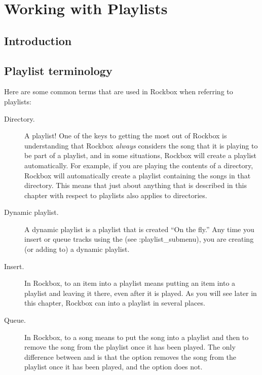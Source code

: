 \chapter{Working with Playlists}
\label{ref:working_with_playlists}

\section{Introduction}

\section{Playlist terminology}

Here are some common terms that are used in Rockbox when referring to 
playlists:

\begin{description}
  
\item[Directory.]  A playlist!  One of the keys to getting the most out of 
  Rockbox is understanding that Rockbox \emph{always} considers the song that 
  it is playing to be part of a playlist, and in some situations, Rockbox will 
  create a playlist automatically.  For example, if you are playing the 
  contents of a directory, Rockbox will automatically create a playlist 
  containing the songs in that directory.  This means that just about anything 
  that is described in this chapter with respect to playlists also applies to 
  directories.
  
\item[Dynamic playlist.]  A dynamic playlist is a playlist that is created 
  ``On the fly.''  Any time you insert or queue tracks using the 
   (see :{playlist_submenu}), you are 
  creating (or adding to) a dynamic playlist.
	
\item[Insert.] In Rockbox, to  an item into a playlist means 
  putting an item into a playlist and leaving it there, even after it is 
  played. As you will see later in this chapter, Rockbox can  
  into a playlist in several places.
	
\item[Queue.]  In Rockbox, to  a song means to put the song 
  into a playlist and then to remove the song from the playlist once it has 
  been played.  The only difference between  and 
   is that the  option removes the song from the 
  playlist once it has been played, and the  option does not.
\end{description}  

